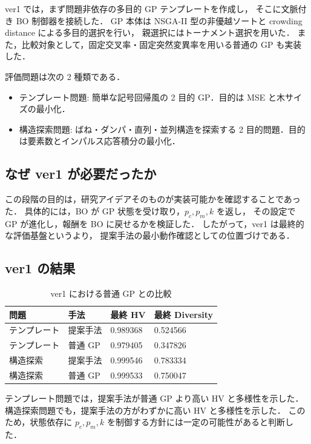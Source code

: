 \documentclass[a4paper,11pt]{ltjsarticle}
\begin{document}
ver1 では，まず問題非依存の多目的 GP テンプレートを作成し，
そこに文脈付き BO 制御器を接続した．
GP 本体は NSGA-II 型の非優越ソートと crowding distance による多目的選択を行い，
親選択にはトーナメント選択を用いた．
また，比較対象として，固定交叉率・固定突然変異率を用いる普通の GP も実装した．

評価問題は次の 2 種類である．
\begin{itemize}[leftmargin=3em]
  \item テンプレート問題: 簡単な記号回帰風の 2 目的 GP．目的は MSE と木サイズの最小化．
  \item 構造探索問題: ばね・ダンパ・直列・並列構造を探索する 2 目的問題．目的は要素数とインパルス応答積分の最小化．
\end{itemize}

\subsection{なぜ ver1 が必要だったか}

この段階の目的は，研究アイデアそのものが実装可能かを確認することであった．
具体的には，BO が GP 状態を受け取り，\(p_c,p_m,k\) を返し，
その設定で GP が進化し，報酬を BO に戻せるかを検証した．
したがって，ver1 は最終的な評価基盤というより，
提案手法の最小動作確認としての位置づけである．

\subsection{ver1 の結果}

\begin{table}[htbp]
\centering
\caption{ver1 における普通 GP との比較}
\begin{tabular}{llll}
\toprule
問題 & 手法 & 最終 HV & 最終 Diversity \\
\midrule
テンプレート & 提案手法 & 0.989368 & 0.524566 \\
テンプレート & 普通 GP & 0.979405 & 0.347826 \\
構造探索 & 提案手法 & 0.999546 & 0.783334 \\
構造探索 & 普通 GP & 0.999533 & 0.750047 \\
\bottomrule
\end{tabular}
\end{table}

テンプレート問題では，提案手法が普通 GP より高い HV と多様性を示した．
構造探索問題でも，提案手法の方がわずかに高い HV と多様性を示した．
このため，状態依存に \(p_c,p_m,k\) を制御する方針には一定の可能性があると判断した．
\end{document}
